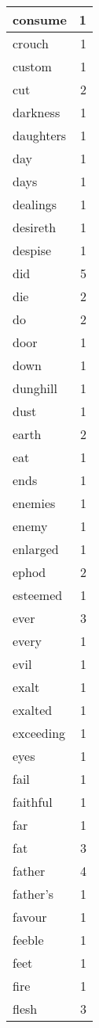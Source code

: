 \begin{center}
\begin{longtable}{l|r}
consume & 1 \\ \hline
crouch & 1 \\ \hline
custom & 1 \\ \hline
cut & 2 \\ \hline
darkness & 1 \\ \hline
daughters & 1 \\ \hline
day & 1 \\ \hline
days & 1 \\ \hline
dealings & 1 \\ \hline
desireth & 1 \\ \hline
despise & 1 \\ \hline
did & 5 \\ \hline
die & 2 \\ \hline
do & 2 \\ \hline
door & 1 \\ \hline
down & 1 \\ \hline
dunghill & 1 \\ \hline
dust & 1 \\ \hline
earth & 2 \\ \hline
eat & 1 \\ \hline
ends & 1 \\ \hline
enemies & 1 \\ \hline
enemy & 1 \\ \hline
enlarged & 1 \\ \hline
ephod & 2 \\ \hline
esteemed & 1 \\ \hline
ever & 3 \\ \hline
every & 1 \\ \hline
evil & 1 \\ \hline
exalt & 1 \\ \hline
exalted & 1 \\ \hline
exceeding & 1 \\ \hline
eyes & 1 \\ \hline
fail & 1 \\ \hline
faithful & 1 \\ \hline
far & 1 \\ \hline
fat & 3 \\ \hline
father & 4 \\ \hline
father's & 1 \\ \hline
favour & 1 \\ \hline
feeble & 1 \\ \hline
feet & 1 \\ \hline
fire & 1 \\ \hline
flesh & 3 \\ \hline

\end{longtable}
\end{center}

